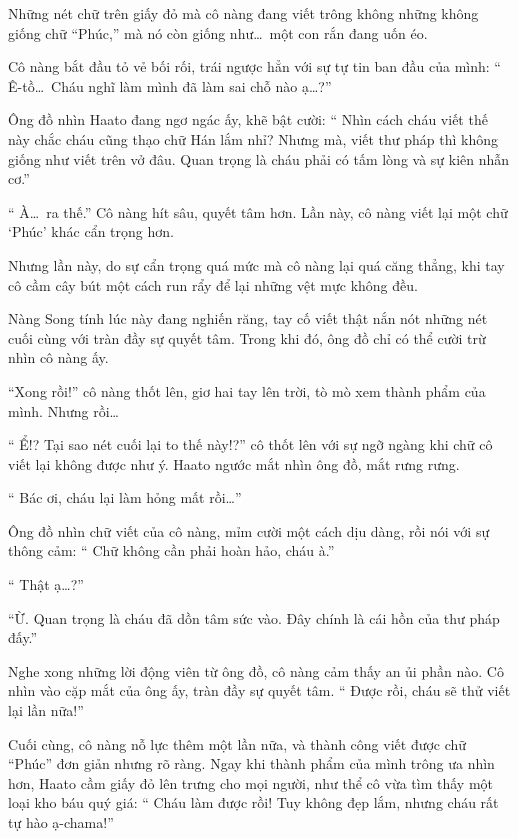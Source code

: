 \documentclass[../main.tex]{subfiles}
\begin{document}
Những nét chữ trên giấy đỏ mà cô nàng đang viết trông không những không giống chữ ``Phúc,'' mà nó còn giống như\dots\ một con rắn đang uốn éo.

Cô nàng bắt đầu tỏ vẻ bối rối, trái ngược hẳn với sự tự tin ban đầu của mình: ``{\color{red} Ê-tồ\dots\ Cháu nghĩ làm mình đã làm sai chỗ nào ạ\dots?}''

Ông đồ nhìn Haato đang ngơ ngác ấy, khẽ bật cười: ``{\color{red} Nhìn cách cháu viết thế này chắc cháu cũng thạo chữ Hán lắm nhỉ? Nhưng mà, viết thư pháp thì không giống như viết trên vở đâu. Quan trọng là cháu phải có tấm lòng và sự kiên nhẫn cơ.}''

``{\color{red} À\dots\ ra thế.}'' Cô nàng hít sâu, quyết tâm hơn. Lần này, cô nàng viết lại một chữ `Phúc' khác cẩn trọng hơn.

Nhưng lần này, do sự cẩn trọng quá mức mà cô nàng lại quá căng thẳng, khi tay cô cầm cây bút một cách run rẩy để lại những vệt mực không đều.

Nàng Song tính lúc này đang nghiến răng, tay cố viết thật nắn nót những nét cuối cùng với tràn đầy sự quyết tâm. Trong khi đó, ông đồ chỉ có thể cười trừ nhìn cô nàng ấy.

``Xong rồi!'' cô nàng thốt lên, giơ hai tay lên trời, tò mò xem thành phẩm của mình. Nhưng rồi\dots

``{\color{red} Ể!? Tại sao nét cuối lại to thế này!?}'' cô thốt lên với sự ngỡ ngàng khi chữ cô viết lại không được như ý. Haato ngước mắt nhìn ông đồ, mắt rưng rưng.

``{\color{red} Bác ơi, cháu lại làm hỏng mất rồi\dots}''

Ông đồ nhìn chữ viết của cô nàng, mỉm cười một cách dịu dàng, rồi nói với sự thông cảm: ``{\color{red} Chữ không cần phải hoàn hảo, cháu à.}''

``{\color{red} Thật ạ\dots?}''

``Ừ. Quan trọng là cháu đã dồn tâm sức vào. Đây chính là cái hồn của thư pháp đấy.''

Nghe xong những lời động viên từ ông đồ, cô nàng cảm thấy an ủi phần nào. Cô nhìn vào cặp mắt của ông ấy, tràn đầy sự quyết tâm. ``{\color{red} Được rồi, cháu sẽ thử viết lại lần nữa!}''

\ct

Cuối cùng, cô nàng nỗ lực thêm một lần nữa, và thành công viết được chữ ``Phúc'' đơn giản nhưng rõ ràng. Ngay khi thành phẩm của mình trông ưa nhìn hơn, Haato cầm giấy đỏ lên trưng cho mọi người, như thể cô vừa tìm thấy một loại kho báu quý giá: ``{\color{red} Cháu làm được rồi! Tuy không đẹp lắm, nhưng cháu rất tự hào ạ-chama!}''
\end{document}
